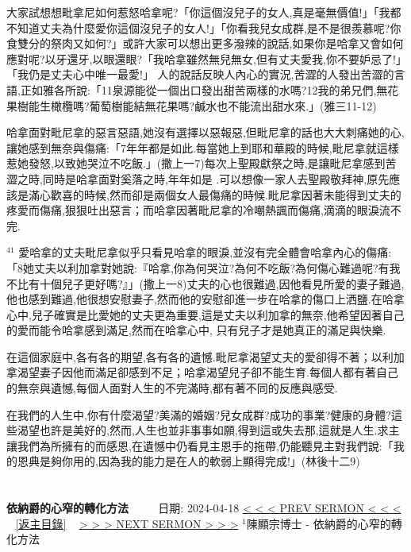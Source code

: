\documentclass{book}
\begin{document}
大家試想想毗拿尼如何惹怒哈拿呢?「你這個沒兒子的女人,真是毫無價值!」「我都不知道丈夫為什麼愛你這個沒兒子的女人!」「你看我兒女成群,是不是很羨慕呢?你食雙分的祭肉又如何?」或許大家可以想出更多潑辣的說話,如果你是哈拿又會如何應對呢?以牙還牙,以眼還眼?「我哈拿雖然無兒無女,但有丈夫愛我,你不要妒忌了!」「我仍是丈夫心中唯一最愛!」
人的說話反映人內心的實況,苦澀的人發出苦澀的言語,正如雅各所說:「11泉源能從一個出口發出甜苦兩樣的水嗎?12我的弟兄們,無花果樹能生橄欖嗎?葡萄樹能結無花果嗎?鹹水也不能流出甜水來.」(雅三11-12)

哈拿面對毗尼拿的惡言惡語,她沒有選擇以惡報惡,但毗尼拿的話也大大刺痛她的心,讓她感到無奈與傷痛:「7年年都是如此.每當她上到耶和華殿的時候,毗尼拿就這樣惹她發怒,以致她哭泣不吃飯.」(撒上一7)每次上聖殿獻祭之時,是讓毗尼拿感到苦澀之時,同時是哈拿面對奚落之時,年年如是 .可以想像一家人去聖殿敬拜神,原先應該是滿心歡喜的時候,然而卻是兩個女人最傷痛的時候.毗尼拿因著未能得到丈夫的疼愛而傷痛,狠狠吐出惡言；而哈拿因著毗尼拿的冷嘲熱諷而傷痛,滴滴的眼淚流不完.

$^{41}$
愛哈拿的丈夫毗尼拿似乎只看見哈拿的眼淚,並沒有完全體會哈拿內心的傷痛:「8她丈夫以利加拿對她說:『哈拿,你為何哭泣?為何不吃飯?為何傷心難過呢?有我不比有十個兒子更好嗎?』」(撒上一8)丈夫的心也很難過,因他看見所愛的妻子難過,他也感到難過,他很想安慰妻子,然而他的安慰卻進一步在哈拿的傷口上洒鹽.在哈拿心中,兒子確實是比愛她的丈夫更為重要,這是丈夫以利加拿的無奈,他希望因著自己的愛而能令哈拿感到滿足,然而在哈拿心中, 只有兒子才是她真正的滿足與快樂.

在這個家庭中,各有各的期望,各有各的遺憾.毗尼拿渴望丈夫的愛卻得不著；以利加拿渴望妻子因他而滿足卻感到不足；哈拿渴望兒子卻不能生育.每個人都有著自己的無奈與遺憾,每個人面對人生的不完滿時,都有著不同的反應與感受.

在我們的人生中,你有什麼渴望?美滿的婚姻?兒女成群?成功的事業?健康的身體?這些渴望也許是美好的,然而,人生也並非事事如願,得到這或失去那,這就是人生.求主讓我們為所擁有的而感恩,在遺憾中仍看見主恩手的拖帶,仍能聽見主對我們說:「我的恩典是夠你用的,因為我的能力是在人的軟弱上顯得完成!」(林後十二9)
\newpage



\section{}
\label{sec:12}
\textbf{依納爵的心窄的轉化方法}
\newline
\newline
~~~~ 日期: 2024-04-18
\newline
\newline
\hyperref[sec:11]{\small{< < < PREV SERMON < < <}}
~
\hyperref[sec:index]{\small{[返主目錄]}}
~
\hyperref[sec:13]{\small{> > > NEXT SERMON > > >}}
\newline
\newline
$^{1}$陳顯宗博士 - 依納爵的心窄的轉化方法
\end{document}
